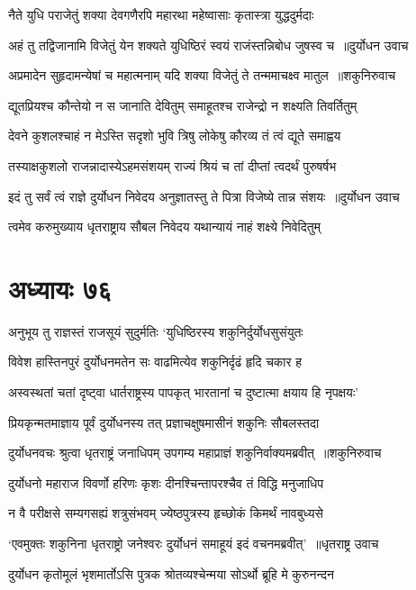 \twolineshloka
{नैते युधि पराजेतुं शक्या देवगणैरपि}
{महारथा महेष्वासाः कृतास्त्रा युद्धदुर्मदाः}


\twolineshloka
{अहं तु तद्विजानामि विजेतुं येन शक्यते}
{युधिष्ठिरं स्वयं राजंस्तन्निबोध जुषस्व च ॥दुर्योधन उवाच}


\threelineshloka
{अप्रमादेन सुहृदामन्येषां च महात्मनाम्}
{यदि शक्या विजेतुं ते तन्ममाचक्ष्व मातुल ॥शकुनिरुवाच}
{}


\twolineshloka
{द्यूतप्रियश्च कौन्तेयो न स जानाति देवितुम्}
{समाहूतश्च राजेन्द्रो न शक्ष्यति तिवर्तितुम्}


\twolineshloka
{देवने कुशलश्चाहं न मेऽस्ति सदृशो भुवि}
{त्रिषु लोकेषु कौरव्य तं त्वं द्यूते समाह्वय}


\twolineshloka
{तस्याक्षकुशलो राजन्नादास्येऽहमसंशयम्}
{राज्यं श्रियं च तां दीप्तां त्वदर्थं पुरुषर्षभ}


\threelineshloka
{इदं तु सर्वं त्वं राज्ञे दुर्योधन निवेदय}
{अनुज्ञातस्तु ते पित्रा विजेष्ये तान्न संशयः ॥दुर्योधन उवाच}
{}


\twolineshloka
{त्वमेव करुमुख्याय धृतराष्ट्राय सौबल}
{निवेदय यथान्यायं नाहं शक्ष्ये निवेदितुम्}


\chapter{अध्यायः ७६}
\twolineshloka
{अनुभूय तु राज्ञस्तं राजसूयं सुदुर्मतिः}
{`युधिष्ठिरस्य शकुनिर्दुर्योधसुसंयुतः}


\twolineshloka
{विवेश हास्तिनपुरं दुर्योधनमतेन सः}
{वाढमित्येव शकुनिर्दृढं हृदि चकार ह}


\twolineshloka
{अस्वस्थतां चतां दृष्ट्वा धार्तराष्ट्रस्य पापकृत्}
{भारतानां च दुष्टात्मा क्षयाय हि नृपक्षयः'}


\twolineshloka
{प्रियकृन्मतमाज्ञाय पूर्वं दुर्योधनस्य तत्}
{प्रज्ञाचक्षुषमासीनं शकुनिः सौबलस्तदा}


\threelineshloka
{दुर्योधनवचः श्रुत्वा धृतराष्ट्रं जनाधिपम्}
{उपगम्य महाप्राज्ञं शकुनिर्वाक्यमब्रवीत् ॥शकुनिरुवाच}
{}


\twolineshloka
{दुर्योधनो महाराज विवर्णो हरिणः कृशः}
{दीनश्चिन्तापरश्चैव तं विद्धि मनुजाधिप}


\twolineshloka
{न वै परीक्षसे सम्यगसह्यं शत्रुसंभवम्}
{ज्येष्ठपुत्रस्य हृच्छोकं किमर्थं नावबुध्यसे}


\threelineshloka
{`एवमुक्तः शकुनिना धृतराष्ट्रो जनेश्वरः}
{दुर्योधनं समाहूयं इदं वचनमब्रवीत्' ॥धृतराष्ट्र उवाच}
{}


\twolineshloka
{दुर्योधन कृतोमूलं भृशमार्तोऽसि पुत्रक}
{श्रोतव्यश्चेन्मया सोऽर्थो ब्रूहि मे कुरुनन्दन}


